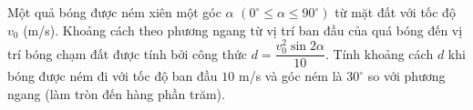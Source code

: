 \begin{ex}%
	Một quả bóng được ném xiên một góc $\alpha$ $(0^\circ \le \alpha \le 90^\circ)$ từ mặt đất với tốc độ $v_0$ (m/s). Khoảng cách theo phương ngang từ vị trí ban đầu của quá bóng đến vị trí bóng chạm đất được tính bởi công thức $d = \dfrac{v_0^2 \sin 2\alpha}{10}$. Tính khoảng cách $d$ khi bóng được ném đi với tốc độ ban đầu $10$ m/s và góc ném là $30^\circ$ so với phương ngang (làm tròn đến hàng phần trăm).
\end{ex}

